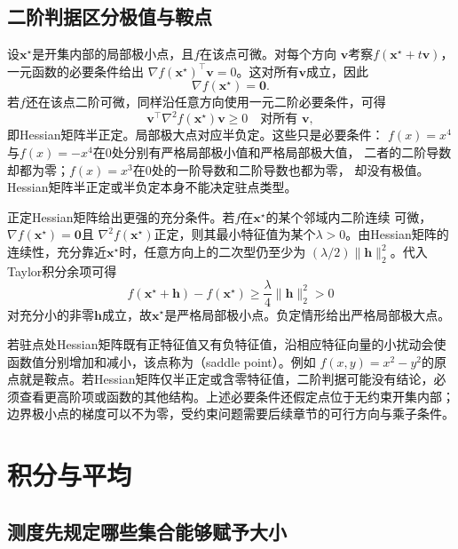 \subsection{二阶判据区分极值与鞍点}

设$\bm{x}^{\star}$是开集内部的局部极小点，且$f$在该点可微。对每个方向 $\bm{v}$考察$f(\bm{x}^{\star}+t\bm{v})$，一元函数的必要条件给出 $\nabla f(\bm{x}^{\star})^{\top}\bm{v}=0$。这对所有$\bm{v}$成立，因此
\begin{equation}
  \nabla f(\bm{x}^{\star})=\bm{0}.
\label{eq:analysis-first-order-necessary}
\end{equation}
若$f$还在该点二阶可微，同样沿任意方向使用一元二阶必要条件，可得
\begin{equation}
  \bm{v}^{\top}\nabla^2f(\bm{x}^{\star})\bm{v}\geq0
  \quad\text{对所有 }\bm{v},
\label{eq:analysis-second-order-necessary}
\end{equation}
即Hessian矩阵半正定。局部极大点对应半负定。这些只是必要条件：
$f(x)=x^4$与$f(x)=-x^4$在$0$处分别有严格局部极小值和严格局部极大值，
二者的二阶导数却都为零；$f(x)=x^3$在$0$处的一阶导数和二阶导数也都为零，
却没有极值。Hessian矩阵半正定或半负定本身不能决定驻点类型。

正定Hessian矩阵给出更强的充分条件。若$f$在$\bm{x}^{\star}$的某个邻域内二阶连续
可微，$\nabla f(\bm{x}^{\star})=\bm{0}$且
$\nabla^2f(\bm{x}^{\star})$正定，则其最小特征值为某个$\lambda>0$。由Hessian矩阵的
连续性，充分靠近$\bm{x}^{\star}$时，任意方向上的二次型仍至少为
$(\lambda/2)\lVert\bm{h}\rVert_2^2$。代入Taylor积分余项可得
\[   f(\bm{x}^{\star}+\bm{h})-f(\bm{x}^{\star})   \geq   \frac{\lambda}{4}\lVert\bm{h}\rVert_2^2>0 \]
对充分小的非零$\bm{h}$成立，故$\bm{x}^{\star}$是严格局部极小点。负定情形给出严格局部极大点。

若驻点处Hessian矩阵既有正特征值又有负特征值，沿相应特征向量的小扰动会使函数值分别增加和减小，该点称为（saddle point）。例如 $f(x,y)=x^2-y^2$的原点就是鞍点。若Hessian矩阵仅半正定或含零特征值，二阶判据可能没有结论，必须查看更高阶项或函数的其他结构。上述必要条件还假定点位于无约束开集内部； 边界极小点的梯度可以不为零，受约束问题需要后续章节的可行方向与乘子条件。
\section{积分与平均}
\label{sec:analysis-integration-average}
\subsection{测度先规定哪些集合能够赋予大小}

